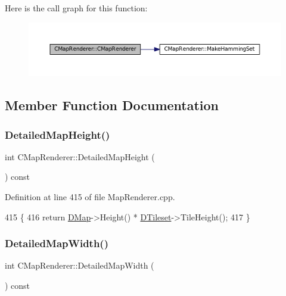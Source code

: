 Here is the call graph for this function\+:\nopagebreak
\begin{figure}[H]
\begin{center}
\leavevmode
\includegraphics[width=350pt]{classCMapRenderer_a9aca3f780976a94fc6e8873e3cf8e199_cgraph}
\end{center}
\end{figure}


\subsection{Member Function Documentation}
\hypertarget{classCMapRenderer_a08177d52d070532e46538ec65c88277d}{}\label{classCMapRenderer_a08177d52d070532e46538ec65c88277d} 
\subsubsection{\texorpdfstring{Detailed\+Map\+Height()}{DetailedMapHeight()}}
{\footnotesize\ttfamily int C\+Map\+Renderer\+::\+Detailed\+Map\+Height (\begin{DoxyParamCaption}{ }\end{DoxyParamCaption}) const}



Definition at line 415 of file Map\+Renderer.\+cpp.


\begin{DoxyCode}
415                                          \{
416     \textcolor{keywordflow}{return} \hyperlink{classCMapRenderer_ab9a199c61aa1c87a3248af3085d8ba52}{DMap}->Height() * \hyperlink{classCMapRenderer_ace0648cba050b5e02431096edd15b836}{DTileset}->TileHeight();
417 \}
\end{DoxyCode}
\hypertarget{classCMapRenderer_a12af1a120fdfa3e80f451ba22fe21a62}{}\label{classCMapRenderer_a12af1a120fdfa3e80f451ba22fe21a62} 
\subsubsection{\texorpdfstring{Detailed\+Map\+Width()}{DetailedMapWidth()}}
{\footnotesize\ttfamily int C\+Map\+Renderer\+::\+Detailed\+Map\+Width (\begin{DoxyParamCaption}{ }\end{DoxyParamCaption}) const}



